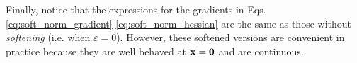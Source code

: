 Finally, notice that the expressions for the gradients in Eqs. \eqref{eq:soft_norm_gradient}-\eqref{eq:soft_norm_hessian} are the same as those without \emph{softening} (i.e. when $\varepsilon=0$). However, these softened versions are convenient in practice because they are well behaved at ${\mathbf{x}}={\mathbf{0}}$ and are continuous.

